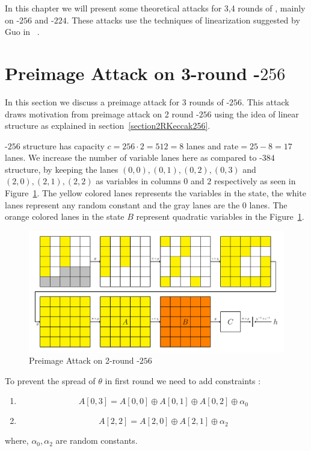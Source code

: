 In this chapter we will present some theoretical attacks for 3,4 rounds of \KECCAK{}, mainly on \KECCAK{}-$256$ and \KECCAK{}-$224$. These attacks use the techniques of linearization suggested by Guo \etal in ~\cite{guo2016linear}.

\section{Preimage Attack on 3-round \Keccak-$256$}
In this section we discuss a preimage attack for 3 rounds of \KECCAK-$256$. This attack draws motivation from preimage attack on 2 round \Keccak-$256$ using the idea of linear structure as explained in section~\ref{section2RKeccak256}. 

\Keccak-$256$ structure has capacity $c = 256\cdot2 = 512 = 8$ lanes and rate$ =  25 - 8 = 17$ lanes. We increase the number of variable lanes here as compared to \Keccak-$384$ structure, by keeping the lanes $(0,0), (0,1), (0,2), (0,3)$ and $(2,0), (2,1), (2,2)$ as variables in columns $0$ and $2$ respectively as seen in Figure~\ref{fig:3rkeccak256}. The yellow colored lanes represents the variables in the state, the white lanes represent any random constant and the gray lanes are the $0$ lanes. The orange colored lanes in the state $B$ represent quadratic variables in the Figure~\ref{fig:3rkeccak256}.

\begin{figure}[H]
        \centering
        \includegraphics[scale=0.7]{3Rkeccak256.pdf}
        \caption{Preimage Attack on 2-round \KECCAK-$256$}
        \label{fig:3rkeccak256}
\end{figure}

To prevent the spread of $\theta$ in first round we need to add constraints :
\begin{enumerate}
\item \[
        A[0,3] = A[0,0] \oplus A[0,1] \oplus A[0, 2] \oplus \alpha_0
    \]
\item \[
        A[2,2] = A[2,0] \oplus A[2,1] \oplus \alpha_2
    \]
\end{enumerate}
where, $\alpha_0, \alpha_2$ are random constants.

